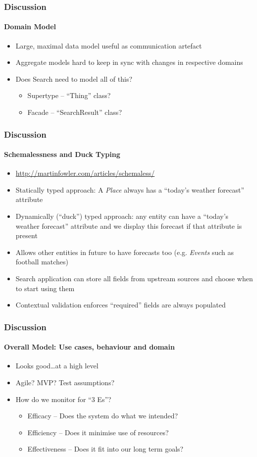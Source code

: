 \documentclass{beamer}
\begin{document}
\begin{frame}
  \frametitle{Discussion}
  \framesubtitle{Domain Model}
  \begin{itemize}
    \item Large, maximal data model useful as communication artefact
    \item Aggregate models hard to keep in sync with changes in respective domains
    \item Does Search need to model all of this?
      \begin{itemize}
        \item Supertype -- ``Thing'' class?
        \item Facade -- ``SearchResult'' class?
      \end{itemize}
  \end{itemize}
\end{frame}

\begin{frame}
  \frametitle{Discussion}
  \framesubtitle{Schemalessness and Duck Typing}
  \begin{itemize}
    \item \url{http://martinfowler.com/articles/schemaless/}
    \item Statically typed approach: A \emph{Place} always has a ``today's weather forecast'' attribute
    \item Dynamically (``duck'') typed approach: any entity can have a ``today's weather forecast'' attribute and we display this forecast if that attribute is present
    \item Allows other entities in future to have forecasts too (e.g. \emph{Events} such as football matches)
    \item Search application can store all fields from upstream sources and choose when to start using them
    \item Contextual validation enforces ``required'' fields are always populated
  \end{itemize}
\end{frame}

\begin{frame}
  \frametitle{Discussion}
  \framesubtitle{Overall Model: Use cases, behaviour and domain}
  \begin{itemize}
    \item Looks good\ldots at a high level
    \item Agile? MVP? Test assumptions?
    \item How do we monitor for ``3 Es''?
      \pause \begin{itemize}
        \item Efficacy -- Does the system do what we intended?
        \item Efficiency -- Does it minimise use of resources?
        \item Effectiveness -- Does it fit into our long term goals?
      \end{itemize}
  \end{itemize}
\end{frame}
\end{document}
